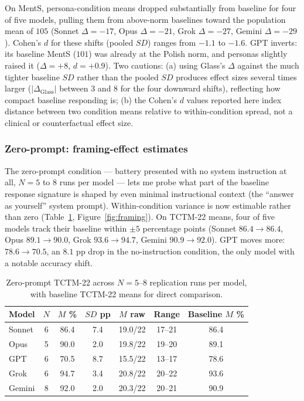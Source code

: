 \documentclass[11pt,a4paper]{article}
\begin{document}
On MentS, persona-condition means dropped substantially from baseline for four of five models, pulling them from above-norm baselines toward the population mean of $105$ (Sonnet $\Delta = -17$, Opus $\Delta = -21$, Grok $\Delta = -27$, Gemini $\Delta = -29$). Cohen's $d$ for these shifts (pooled $SD$) ranges from $-1.1$ to $-1.6$. GPT inverts: its baseline MentS ($101$) was already at the Polish norm, and personas slightly raised it ($\Delta = +8$, $d = +0.9$). Two cautions: (a) using Glass's $\Delta$ against the much tighter baseline $SD$ rather than the pooled $SD$ produces effect sizes several times larger ($|\Delta_{\text{Glass}}|$ between 3 and 8 for the four downward shifts), reflecting how compact baseline responding is; (b) the Cohen's $d$ values reported here index distance between two condition means relative to within-condition spread, not a clinical or counterfactual effect size.

\subsubsection*{Zero-prompt: framing-effect estimates}

The zero-prompt condition --- battery presented with no system instruction at all, $N = 5$ to $8$ runs per model --- lets me probe what part of the baseline response signature is shaped by even minimal instructional context (the ``answer as yourself'' system prompt). Within-condition variance is now estimable rather than zero (Table~\ref{tab:noprompt-tctm}, Figure~\ref{fig:framing}). On TCTM-22 means, four of five models track their baseline within $\pm 5$ percentage points (Sonnet $86.4 \to 86.4$, Opus $89.1 \to 90.0$, Grok $93.6 \to 94.7$, Gemini $90.9 \to 92.0$). GPT moves more: $78.6 \to 70.5$, an $8.1$ pp drop in the no-instruction condition, the only model with a notable accuracy shift.

\begin{table}[htbp]\centering\footnotesize
\caption{Zero-prompt TCTM-22 across $N = 5$--$8$ replication runs per model, with baseline TCTM-22 means for direct comparison.}
\label{tab:noprompt-tctm}
\begin{tabular}{lcccccc}
\toprule
\textbf{Model} & $N$ & $M$ \% & $SD$ pp & $M$ raw & Range & Baseline $M$ \% \\
\midrule
Sonnet & 6 & 86.4 & 7.4 & 19.0/22 & 17--21 & 86.4 \\
Opus & 5 & 90.0 & 2.0 & 19.8/22 & 19--20 & 89.1 \\
GPT & 6 & 70.5 & 8.7 & 15.5/22 & 13--17 & 78.6 \\
Grok & 6 & 94.7 & 3.4 & 20.8/22 & 20--22 & 93.6 \\
Gemini & 8 & 92.0 & 2.0 & 20.3/22 & 20--21 & 90.9 \\
\bottomrule
\end{tabular}
\end{table}
\end{document}
